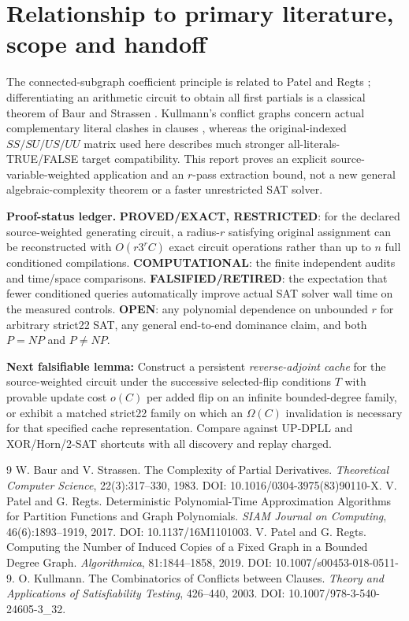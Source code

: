 \documentclass[11pt]{article}
\begin{document}
\section{Relationship to primary literature, scope and handoff}
The connected-subgraph coefficient principle is related to Patel and Regts \cite{PatelRegts2017,PatelRegts2019}; differentiating an arithmetic circuit to obtain all first partials is a classical theorem of Baur and Strassen \cite{BaurStrassen1983}. Kullmann's conflict graphs concern actual complementary literal clashes in clauses \cite{Kullmann2003}, whereas the original-indexed $SS/SU/US/UU$ matrix used here describes much stronger all-literals-TRUE/FALSE target compatibility. This report proves an explicit source-variable-weighted application and an $r$-pass extraction bound, not a new general algebraic-complexity theorem or a faster unrestricted SAT solver.

\noindent\textbf{Proof-status ledger.} \textbf{PROVED/EXACT, RESTRICTED}: for the declared source-weighted generating circuit, a radius-$r$ satisfying original assignment can be reconstructed with $O(r3^r C)$ exact circuit operations rather than up to $n$ full conditioned compilations. \textbf{COMPUTATIONAL}: the finite independent audits and time/space comparisons. \textbf{FALSIFIED/RETIRED}: the expectation that fewer conditioned queries automatically improve actual SAT solver wall time on the measured controls. \textbf{OPEN}: any polynomial dependence on unbounded $r$ for arbitrary strict22 SAT, any general end-to-end dominance claim, and both $P=NP$ and $P\ne NP$.

\noindent\textbf{Next falsifiable lemma:} Construct a persistent \emph{reverse-adjoint cache} for the source-weighted circuit under the successive selected-flip conditions $T$ with provable update cost $o(C)$ per added flip on an infinite bounded-degree family, or exhibit a matched strict22 family on which an $\Omega(C)$ invalidation is necessary for that specified cache representation. Compare against UP-DPLL and XOR/Horn/2-SAT shortcuts with all discovery and replay charged.

\begin{thebibliography}{9}
 W. Baur and V. Strassen. The Complexity of Partial Derivatives. \emph{Theoretical Computer Science}, 22(3):317--330, 1983. DOI: 10.1016/0304-3975(83)90110-X.
 V. Patel and G. Regts. Deterministic Polynomial-Time Approximation Algorithms for Partition Functions and Graph Polynomials. \emph{SIAM Journal on Computing}, 46(6):1893--1919, 2017. DOI: 10.1137/16M1101003.
 V. Patel and G. Regts. Computing the Number of Induced Copies of a Fixed Graph in a Bounded Degree Graph. \emph{Algorithmica}, 81:1844--1858, 2019. DOI: 10.1007/s00453-018-0511-9.
 O. Kullmann. The Combinatorics of Conflicts between Clauses. \emph{Theory and Applications of Satisfiability Testing}, 426--440, 2003. DOI: 10.1007/978-3-540-24605-3\_32.
\end{thebibliography}
\end{document}
